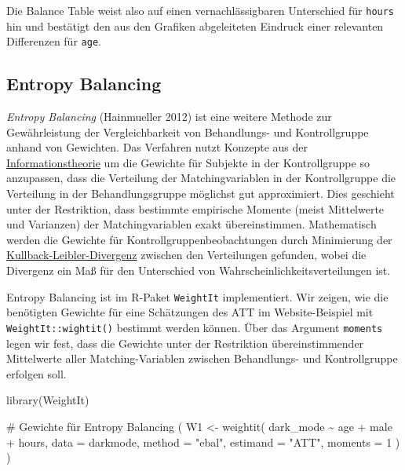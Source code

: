 \documentclass[
  a4paper,
  DIV=11,
  oneside]{scrreprt}
\newenvironment{Shaded}{\begin{snugshade}}{\end{snugshade}}
\newcommand{\AttributeTok}[1]{\textcolor[rgb]{0.40,0.45,0.13}{#1}}
\newcommand{\CommentTok}[1]{\textcolor[rgb]{0.37,0.37,0.37}{#1}}
\newcommand{\DecValTok}[1]{\textcolor[rgb]{0.68,0.00,0.00}{#1}}
\newcommand{\FunctionTok}[1]{\textcolor[rgb]{0.28,0.35,0.67}{#1}}
\newcommand{\NormalTok}[1]{\textcolor[rgb]{0.00,0.23,0.31}{#1}}
\newcommand{\OtherTok}[1]{\textcolor[rgb]{0.00,0.23,0.31}{#1}}
\newcommand{\SpecialCharTok}[1]{\textcolor[rgb]{0.37,0.37,0.37}{#1}}
\newcommand{\StringTok}[1]{\textcolor[rgb]{0.13,0.47,0.30}{#1}}
\begin{document}
Die Balance Table weist also auf einen vernachlässigbaren Unterschied
für \texttt{hours} hin und bestätigt den aus den Grafiken abgeleiteten
Eindruck einer relevanten Differenzen für \texttt{age}.

\subsection{Entropy Balancing}\label{entropy-balancing}

\emph{Entropy Balancing} (Hainmueller 2012) ist eine weitere Methode zur
Gewährleistung der Vergleichbarkeit von Behandlungs- und Kontrollgruppe
anhand von Gewichten. Das Verfahren nutzt Konzepte aus der
\href{https://de.wikipedia.org/wiki/Informationstheorie}{Informationstheorie}
um die Gewichte für Subjekte in der Kontrollgruppe so anzupassen, dass
die Verteilung der Matchingvariablen in der Kontrollgruppe die
Verteilung in der Behandlungsgruppe möglichst gut approximiert. Dies
geschieht unter der Restriktion, dass bestimmte empirische Momente
(meist Mittelwerte und Varianzen) der Matchingvariablen exakt
übereinstimmen. Mathematisch werden die Gewichte für
Kontrollgruppenbeobachtungen durch Minimierung der
\href{https://de.wikipedia.org/wiki/Kullback-Leibler-Divergenz}{Kullback-Leibler-Divergenz}
zwischen den Verteilungen gefunden, wobei die Divergenz ein Maß für den
Unterschied von Wahrscheinlichkeitsverteilungen ist.

Entropy Balancing ist im R-Paket \texttt{WeightIt} implementiert. Wir
zeigen, wie die benötigten Gewichte für eine Schätzungen des ATT im
Website-Beispiel mit \texttt{WeightIt::wightit()} bestimmt werden
können. Über das Argument \texttt{moments} legen wir fest, dass die
Gewichte unter der Restriktion übereinstimmender Mittelwerte aller
Matching-Variablen zwischen Behandlungs- und Kontrollgruppe erfolgen
soll.

\begin{Shaded}
\begin{Highlighting}[]
\FunctionTok{library}\NormalTok{(WeightIt)}

\CommentTok{\# Gewichte für Entropy Balancing}
\NormalTok{(}
\NormalTok{  W1 }\OtherTok{\textless{}{-}} \FunctionTok{weightit}\NormalTok{(}
\NormalTok{  dark\_mode }\SpecialCharTok{\textasciitilde{}}\NormalTok{ age }\SpecialCharTok{+}\NormalTok{ male }\SpecialCharTok{+}\NormalTok{ hours,}
  \AttributeTok{data =}\NormalTok{ darkmode,}
  \AttributeTok{method =} \StringTok{"ebal"}\NormalTok{, }
  \AttributeTok{estimand =} \StringTok{"ATT"}\NormalTok{,}
  \AttributeTok{moments =} \DecValTok{1}
\NormalTok{  )}
\NormalTok{ )}
\end{Highlighting}
\end{Shaded}
\end{document}
